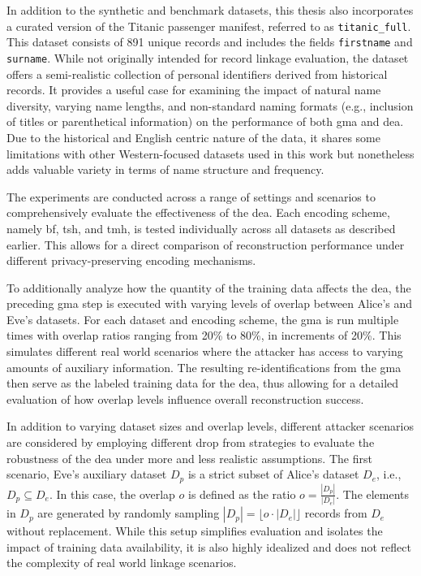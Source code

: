 In addition to the synthetic and benchmark datasets, this thesis also incorporates a curated version of the Titanic passenger manifest, referred to as \texttt{titanic\_full}.
This dataset consists of 891 unique records and includes the fields \texttt{firstname} and \texttt{surname}.
While not originally intended for record linkage evaluation, the dataset offers a semi-realistic collection of personal identifiers derived from historical records.
It provides a useful case for examining the impact of natural name diversity, varying name lengths, and non-standard naming formats (e.g., inclusion of titles or parenthetical information) on the performance of both \ac{gma} and \ac{dea}.
Due to the historical and English centric nature of the data, it shares some limitations with other Western-focused datasets used in this work but nonetheless adds valuable variety in terms of name structure and frequency.

The experiments are conducted across a range of settings and scenarios to comprehensively evaluate the effectiveness of the \ac{dea}.
Each encoding scheme, namely \ac{bf}, \ac{tsh}, and \ac{tmh}, is tested individually across all datasets as described earlier.
This allows for a direct comparison of reconstruction performance under different privacy-preserving encoding mechanisms.

To additionally analyze how the quantity of the training data affects the \ac{dea}, the preceding \ac{gma} step is executed with varying levels of overlap between Alice's and Eve's datasets.
For each dataset and encoding scheme, the \ac{gma} is run multiple times with overlap ratios ranging from 20\% to 80\%, in increments of 20\%.
This simulates different real world scenarios where the attacker has access to varying amounts of auxiliary information.
The resulting re-identifications from the \ac{gma} then serve as the labeled training data for the \ac{dea}, thus allowing for a detailed evaluation of how overlap levels influence overall reconstruction success.

In addition to varying dataset sizes and overlap levels, different attacker scenarios are considered by employing different drop from strategies to evaluate the robustness of the \ac{dea} under more and less realistic assumptions.
The first scenario, Eve's auxiliary dataset $D_p$ is a strict subset of Alice's dataset $D_e$, i.e., $D_p \subseteq D_e$.
In this case, the overlap $o$ is defined as the ratio $o = \frac{|D_p|}{|D_e|}$.
The elements in $D_p$ are generated by randomly sampling $|D_p| = \lfloor o \cdot |D_e| \rfloor$ records from $D_e$ without replacement.
While this setup simplifies evaluation and isolates the impact of training data availability, it is also highly idealized and does not reflect the complexity of real world linkage scenarios.

